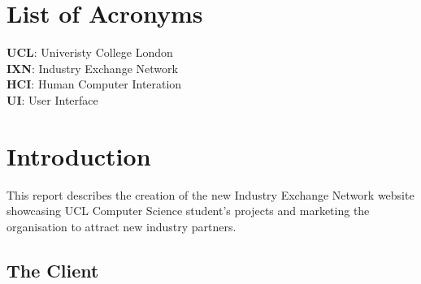 \documentclass[fontsize=10pt]{extarticle}
\numberwithin{figure}{section} %
\begin{document}

\newpage



\begin{abstract}

\end{abstract}

\tableofcontents
%
%
\newpage

\listoftables
{}
\listoffigures
{}
\section*{List of Acronyms}\label{acronyms}
\textbf{UCL}: Univeristy College London \\
\textbf{IXN}: Industry Exchange Network \\
\textbf{HCI}: Human Computer Interation \\
\textbf{UI}: User Interface \\


\newpage

\clearpage
{}
\hypertarget{introduction}{%
\section{Introduction}\label{introduction}}

This report describes the creation of the new Industry Exchange Network
website showcasing UCL Computer Science student's projects and marketing
the organisation to attract new industry partners.

\hypertarget{the-client}{%
\subsection{The Client}\label{the-client}}
\end{document}
